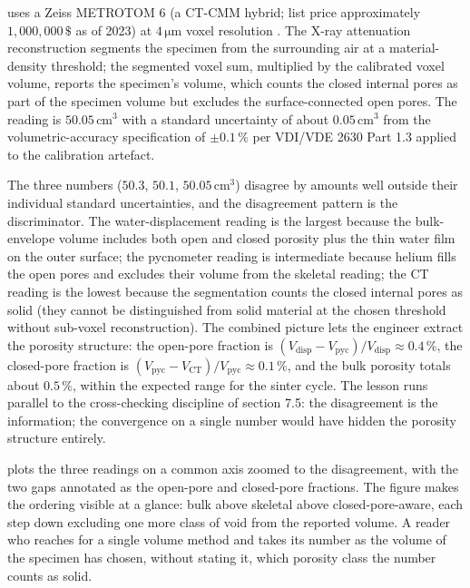  uses a Zeiss METROTOM 6
(a CT-CMM hybrid; list price approximately $1{,}000{,}000 \,\$ $
as of 2023) at $4 \,\si{\micro\meter}$ voxel resolution
\cite{ch07t3b-web:zeiss-metrotom-6}. The X-ray attenuation
reconstruction segments the specimen from the surrounding air at a
material-density threshold; the segmented voxel sum, multiplied by
the calibrated voxel volume, reports the specimen's
 volume, which counts the closed
internal pores as part of the specimen volume but excludes the
surface-connected open pores. The reading is $50.05 \,\si{
\centi\meter\cubed}$ with a standard uncertainty of about
$0.05 \,\si{\centi\meter\cubed}$ from the volumetric-accuracy
specification of $\pm 0.1\,\%$ per VDI/VDE 2630 Part 1.3
\cite{ch07t3b-std:vdi-vde-2630-1-3} applied to the calibration
artefact.

The three numbers ($50.3$, $50.1$, $50.05 \,\si{\centi\meter
\cubed}$) disagree by amounts well outside their individual
standard uncertainties, and the disagreement pattern is the
discriminator. The water-displacement reading is the largest because
the bulk-envelope volume includes both open and closed porosity
plus the thin water film on the outer surface; the pycnometer
reading is intermediate because helium fills the open pores and
excludes their volume from the skeletal reading; the CT reading is
the lowest because the segmentation counts the closed internal
pores as solid (they cannot be distinguished from solid material at
the chosen threshold without sub-voxel reconstruction). The
combined picture lets the engineer extract the porosity structure:
the open-pore fraction is
$(V_{\mathrm{disp}} - V_{\mathrm{pyc}})/V_{\mathrm{disp}}
\approx 0.4\,\%$, the closed-pore fraction is
$(V_{\mathrm{pyc}} - V_{\mathrm{CT}})/V_{\mathrm{pyc}}
\approx 0.1\,\%$, and the bulk porosity totals about $0.5\,\%$,
within the expected range for the sinter cycle. The lesson runs
parallel to the cross-checking discipline of section 7.5: the
disagreement is the information; the convergence on a single
number would have hidden the porosity structure entirely.



 plots the three
readings on a common axis zoomed to the disagreement, with the two
gaps annotated as the open-pore and closed-pore fractions. The
figure makes the ordering visible at a glance: bulk above skeletal
above closed-pore-aware, each step down excluding one more class of
void from the reported volume. A reader who reaches for a single
volume method and takes its number as the volume of the specimen has
chosen, without stating it, which porosity class the number counts
as solid.

